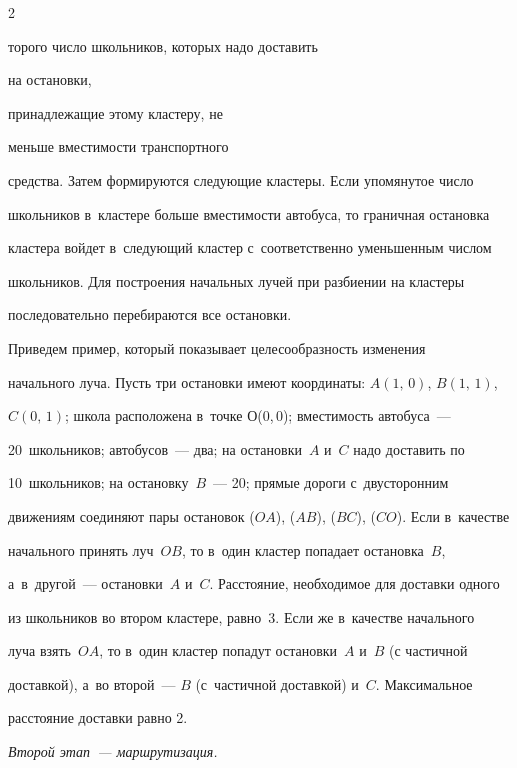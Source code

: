 \begin{multicols}{2}
\addtocounter{figure}{1}





\noindent

торого число школьников, которых надо доставить

 на остановки,

принадлежащие этому кластеру, не

меньше вместимости транспортного

средства. Затем формируются следующие кластеры. Если упомянутое число

школьников в~кластере больше вмес\-ти\-мости автобуса, то граничная остановка

кластера войдет в~следующий кластер с~соответственно уменьшенным чис\-лом

школьников. Для по\-стро\-ения начальных лучей при разбиении на кластеры

последовательно перебираются все остановки.







     Приведем пример, который показывает целесообразность изменения

начального луча. Пусть три остановки имеют координаты: $A(1,\,0)$, $B(1,\,1)$,

$C(0,\,1)$; школа расположена в~точке О(0,\,0); вместимость автобуса~---

20~школьников; автобусов~--- два; на остановки~$A$ и~$C$ надо доставить по

10~школьников; на остановку~$B$~--- 20; прямые дороги с~двусторонним

движениям соединяют пары остановок ($OA$), ($AB$), ($BC$), ($CO$). Если в~качестве

начального принять луч~$OB$, то в~один кластер попадает остановка~$B$,

а~в~другой~--- остановки~$A$ и~$C$. Расстояние, необходимое для доставки одного

из школьников во втором кластере, равно~3. Если же в~качестве начального

луча взять~$OA$, то в~один кластер попадут остановки~$A$ и~$B$ (с частичной

доставкой), а~во второй~--- $B$ (с~частичной доставкой) и~$C$. Максимальное

расстояние доставки равно 2.



     \textit{Второй этап~--- маршрутизация.}




\end{multicols}

